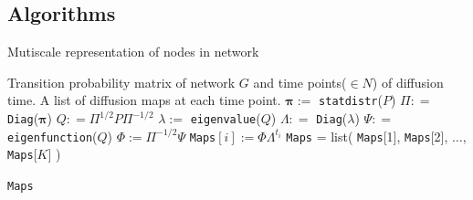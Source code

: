 \documentclass[12pt]{article}
\theoremstyle{definition}
\begin{document}
\subsection{Algorithms}

\begin{algorithm}[H]
	\caption{Mutiscale representation of nodes in network}
	\begin{algorithmic}[1]
		\Require Transition probability matrix of network $G$ and time points($\in N$) of diffusion time. 
		\Ensure A list of diffusion maps at each time point.
		\State $\mathbf{\pi} :=$ \texttt{statdistr}($P$) 
		\State $\Pi : =$ \texttt{Diag}($\mathbf{\pi}$)
		\State $Q: = \Pi^{1/2} P \Pi^{-1/2}$ 
		\State $\lambda := $ \texttt{eigenvalue}($Q$)
		\State $\Lambda : =$ \texttt{Diag}($\lambda$)
		\State $\Psi : =$ \texttt{eigenfunction}($Q$) 
		\State $\Phi :=  \Pi^{-1/2} \Psi$
		\Begin
		\State \texttt{Maps}$[i] := \Phi \Lambda^{t_{i}}$  
		\End
		\EndFor
		\State \texttt{Maps} = list( \texttt{Maps}[1], \texttt{Maps}[2], $\ldots$, \texttt{Maps}[$K$]  )
		
		\Return \texttt{Maps}
		\EndFunction
	\end{algorithmic}
\end{algorithm}
\end{document}
